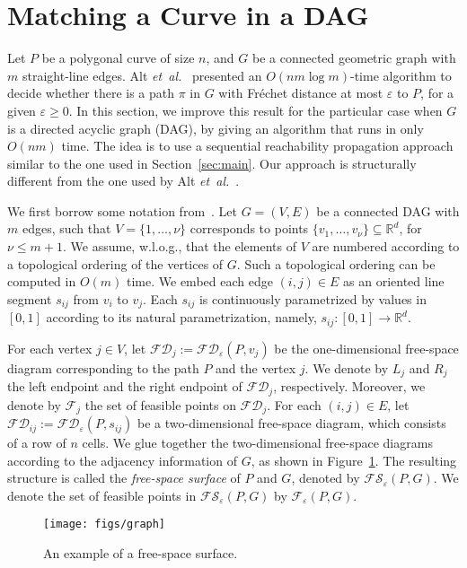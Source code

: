 \documentclass[12pt]{dalthesis}
\newcommand{\IR}{\ensuremath{\mathbb{R}}}
\newcommand{\lee}{\leqslant}
\newcommand{\gee}{\geqslant}
\newcommand{\set}[1]{{\{ #1 \}}}
\newcommand{\eps}{\varepsilon}
\newcommand{\etal}{{\em et~al.\/}}
\newcommand{\CF}{{\mathscr F}}
\newcommand{\Frechet}{Fr\'echet }
\newcommand{\fs}{free-space }
\newcommand{\FD}{\mathscr {FD}}
\newcommand{\FS}{\mathscr {FS}}
\newcommand{\F}{\CF}
\begin{document}
\section{Matching a Curve in a DAG} \label{sec:graph}

Let $P$ be a polygonal curve of size $n$, 
and $G$ be a connected geometric graph with $m$ straight-line edges.
Alt \etal~\cite{AltERW03a} presented an $O(nm \log m)$-time algorithm 
to decide whether
there is a path $\pi$ in $G$ with \Frechet distance at most $\eps$ to $P$, 
for a given $\eps \gee 0$.
In this section, 
we improve this result for the particular case when $G$ is a directed acyclic graph (DAG), 
by giving an algorithm that runs in only $O(nm)$ time.
The idea is to use a sequential reachability propagation approach 
similar to the one used in Section~\ref{sec:main}.
Our approach is structurally different from
the one used by Alt \etal~\cite{AltERW03a}.


We first borrow some notation from~\cite{AltERW03a}.
Let $G=(V,E)$ be a connected DAG with $m$ edges,
such that $V = \set{1, \ldots, \nu}$
corresponds to points $\set{v_1, \ldots, v_\nu} \subseteq \IR^d$, for $\nu \lee m+1$.
We assume, w.l.o.g., that the elements of $V$ are numbered
according to a topological ordering of the vertices of $G$.
Such a topological ordering can be computed in $O(m)$ time.
We embed each edge $(i,j) \in E$ as
an oriented line segment $s_{ij}$ from $v_i$ to $v_j$. 
Each $s_{ij}$ is continuously parametrized 
by values in $[0,1]$ according to its natural parametrization,
namely, $s_{ij}: [0,1] \rightarrow \IR^d$.

For each vertex $j \in V$, let $\FD_{j} := \FD_\eps(P, v_{j})$ 
be the one-dimensional \fs diagram corresponding 
to the path $P$ and the vertex $j$.
We denote by $L_j$ and $R_j$ the left endpoint and the right endpoint
of $\FD_j$, respectively.
Moreover, we denote by $\F_j$ the set of feasible points on $\FD_{j}$.
For each $(i,j) \in E$, let $\FD_{ij} := \FD_\eps(P, s_{ij})$
be a two-dimensional \fs diagram, which consists
of a row of $n$ cells.
We glue together the two-dimensional \fs diagrams
according to the adjacency information of $G$,
as shown in Figure~\ref{fig:graph}.
The resulting structure is called the \emph{\fs surface} of $P$ and $G$,
denoted by $\FS_\eps(P,G)$.
We denote the set of feasible points in $\FS_\eps(P,G)$ by $\F_\eps(P,G)$. 

\begin{figure}[t]
	\centering
	\texttt{[image: figs/graph]}
	\caption{An example of a \fs surface.}
	\label{fig:graph}
\end{figure}
\end{document}
